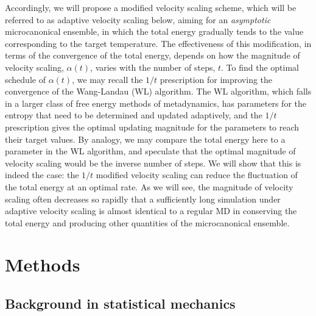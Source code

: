 \documentclass[reprint]{revtex4-1}
\begin{document}
Accordingly,
we will propose a modified velocity scaling scheme,
which will be referred to as adaptive velocity scaling below,
aiming for an \emph{asymptotic} microcanonical ensemble,
in which
the total energy gradually tends to the value
corresponding to the target temperature.
%
The effectiveness of this modification,
in terms of the convergence of the total energy,
depends on how
the magnitude of velocity scaling, $\alpha(t)$,
varies with the number of steps, $t$.
%
To find the optimal schedule of $\alpha(t)$,
we may recall the $1/t$ prescription\cite{
  belardinelli2007, *belardinelli2007jcp, *belardinelli2008,
  zhou2005, *zhou2008, *morozov2007}
for improving the convergence of
the Wang-Landau (WL) algorithm\cite{
  wang2001, *wang2001pre}.
%
The WL algorithm,
which falls in a larger class of free energy methods
of metadynamics\cite{
  laio2002, laio2008, marsili2006},
has parameters for the entropy that need to be
determined and updated adaptively,
and the $1/t$ prescription gives the optimal updating magnitude
for the parameters to reach their target values.
%
By analogy, we may compare the total energy here
to a parameter in the WL algorithm,
and speculate that the optimal magnitude
of velocity scaling would be
the inverse number of steps.
%
We will show that this is indeed the case:
the $1/t$ modified velocity scaling can reduce
the fluctuation of the total energy
at an optimal rate.
%
%
As we will see,
the magnitude of velocity scaling
often decreases so rapidly that
a sufficiently long simulation under adaptive velocity scaling
is almost identical to a regular MD
in conserving the total energy and producing other quantities
of the microcanonical ensemble.



\section{Methods}



\subsection{Background in statistical mechanics}
\end{document}
